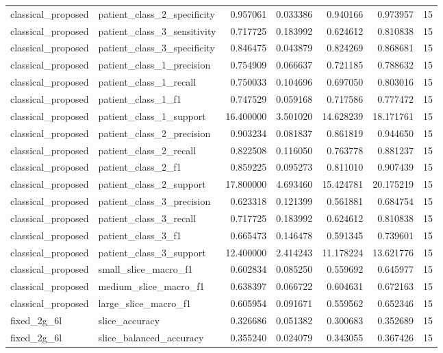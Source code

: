 \begin{tabular}{llrrrrr}
classical_proposed & patient_class_2_specificity & 0.957061 & 0.033386 & 0.940166 & 0.973957 & 15 \\
classical_proposed & patient_class_3_sensitivity & 0.717725 & 0.183992 & 0.624612 & 0.810838 & 15 \\
classical_proposed & patient_class_3_specificity & 0.846475 & 0.043879 & 0.824269 & 0.868681 & 15 \\
classical_proposed & patient_class_1_precision & 0.754909 & 0.066637 & 0.721185 & 0.788632 & 15 \\
classical_proposed & patient_class_1_recall & 0.750033 & 0.104696 & 0.697050 & 0.803016 & 15 \\
classical_proposed & patient_class_1_f1 & 0.747529 & 0.059168 & 0.717586 & 0.777472 & 15 \\
classical_proposed & patient_class_1_support & 16.400000 & 3.501020 & 14.628239 & 18.171761 & 15 \\
classical_proposed & patient_class_2_precision & 0.903234 & 0.081837 & 0.861819 & 0.944650 & 15 \\
classical_proposed & patient_class_2_recall & 0.822508 & 0.116050 & 0.763778 & 0.881237 & 15 \\
classical_proposed & patient_class_2_f1 & 0.859225 & 0.095273 & 0.811010 & 0.907439 & 15 \\
classical_proposed & patient_class_2_support & 17.800000 & 4.693460 & 15.424781 & 20.175219 & 15 \\
classical_proposed & patient_class_3_precision & 0.623318 & 0.121399 & 0.561881 & 0.684754 & 15 \\
classical_proposed & patient_class_3_recall & 0.717725 & 0.183992 & 0.624612 & 0.810838 & 15 \\
classical_proposed & patient_class_3_f1 & 0.665473 & 0.146478 & 0.591345 & 0.739601 & 15 \\
classical_proposed & patient_class_3_support & 12.400000 & 2.414243 & 11.178224 & 13.621776 & 15 \\
classical_proposed & small_slice_macro_f1 & 0.602834 & 0.085250 & 0.559692 & 0.645977 & 15 \\
classical_proposed & medium_slice_macro_f1 & 0.638397 & 0.066722 & 0.604631 & 0.672163 & 15 \\
classical_proposed & large_slice_macro_f1 & 0.605954 & 0.091671 & 0.559562 & 0.652346 & 15 \\
fixed_2g_6l & slice_accuracy & 0.326686 & 0.051382 & 0.300683 & 0.352689 & 15 \\
fixed_2g_6l & slice_balanced_accuracy & 0.355240 & 0.024079 & 0.343055 & 0.367426 & 15 \\

\end{tabular}
